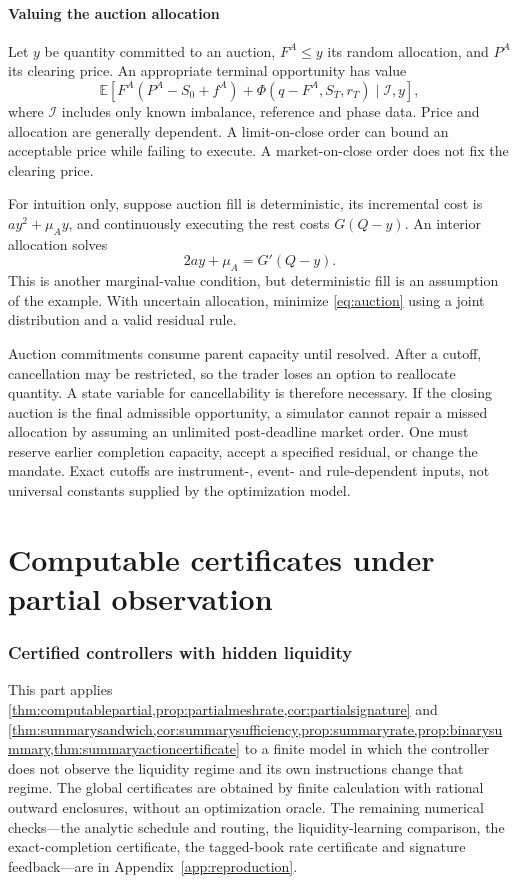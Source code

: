 \documentclass[11pt]{article}
\numberwithin{equation}{section}
\theoremstyle{definition}
\theoremstyle{remark}
\newcommand{\E}{\mathbb{E}}
\theoremstyle{definition}
\begin{document}
\subsection{Valuing the auction allocation}

Let $y$ be quantity committed to an auction, $F^A\leq y$ its random allocation,
and $P^A$ its clearing price. An appropriate terminal opportunity has value
\begin{equation}\label{eq:auction}
 \E\left[F^A(P^A-S_0+f^A)
          +\Phi(q-F^A,S_T,r_T)\mid \mathcal I, y\right],
\end{equation}
where $\mathcal I$ includes only known imbalance, reference and phase data.
Price and allocation are generally dependent. A limit-on-close order can
bound an acceptable price while failing to execute. A market-on-close order
does not fix the clearing price.

For intuition only, suppose auction fill is deterministic, its incremental
cost is $ay^2+\mu_Ay$, and continuously executing the rest costs $G(Q-y)$.
An interior allocation solves
\begin{equation}\label{eq:auctionmarginal}
 2ay+\mu_A=G'(Q-y).
\end{equation}
This is another marginal-value condition, but deterministic fill is an
assumption of the example. With uncertain allocation, minimize
\eqref{eq:auction} using a joint distribution and a valid residual rule.

Auction commitments consume parent capacity until resolved. After a cutoff,
cancellation may be restricted, so the trader loses an option to reallocate
quantity. A state variable for cancellability is therefore necessary. If the
closing auction is the final admissible opportunity, a simulator cannot repair
a missed allocation by assuming an unlimited post-deadline market order.
One must reserve earlier completion capacity, accept a specified residual,
or change the mandate. Exact cutoffs are instrument-, event- and rule-dependent
inputs, not universal constants supplied by the optimization model.

\part{Computable certificates under partial observation}\label{pt:experiments}
\section{Certified controllers with hidden liquidity}\label{sec:experiments}
This part applies \cref{thm:computablepartial,prop:partialmeshrate,cor:partialsignature}
and \cref{thm:summarysandwich,cor:summarysufficiency,prop:summaryrate,prop:binarysummary,thm:summaryactioncertificate} to a finite model in which the controller does not observe
the liquidity regime and its own instructions change that regime. The global
certificates are obtained by finite calculation with rational outward
enclosures, without an optimization oracle. The remaining numerical checks---the
analytic schedule and routing, the liquidity-learning comparison, the
exact-completion certificate, the tagged-book rate certificate and
signature feedback---are in Appendix~\ref{app:reproduction}.
\end{document}
